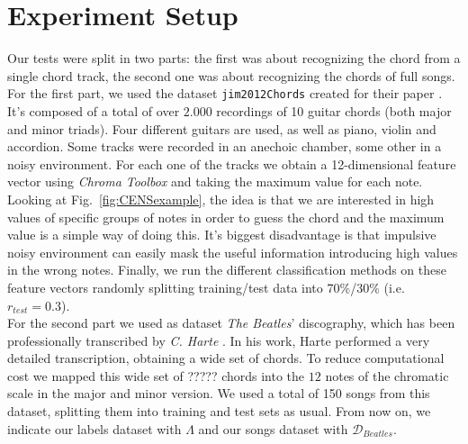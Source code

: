 \section{Experiment Setup}
\label{sec:setup}

Our tests were split in two parts: the first was about recognizing the chord from a single chord track, the second one was about recognizing the chords of full songs.\\
%
For the first part, we used the dataset \texttt{jim2012Chords} \cite{jim2012Chords} created for their paper \cite{JimChordsPaper}. It's composed of a total of over $2.000$ recordings of 10 guitar chords (both major and minor triads). Four different guitars are used, as well as piano, violin and accordion. Some tracks were recorded in an anechoic chamber, some other in a noisy environment. For each one of the tracks we obtain a 12-dimensional feature vector using \textit{Chroma Toolbox} and taking the maximum value for each note. Looking at Fig.~\ref{fig:CENSexample}, the idea is that we are interested in high values of specific groups of notes in order to guess the chord and the maximum value is a simple way of doing this. It's biggest disadvantage is that impulsive noisy environment can easily mask the useful information introducing high values in the wrong notes. Finally, we run the different classification methods on these feature vectors randomly splitting training/test data into 70\%/30\% (i.e. $r_{test}=0.3$).\\
%
For the second part we used as dataset \textit{The Beatles}' discography, which has been professionally transcribed by \textit{C. Harte} \cite{HartePaper}\cite{HarteThesis}. In his work, Harte performed a very detailed transcription, obtaining a wide set of chords. To reduce computational cost we mapped this wide set of ????? chords into the $12$ notes of the chromatic scale in the major and minor version. We used a total of 150 songs from this dataset, splitting them into training and test sets as usual. From now on, we indicate our labels dataset with $\Lambda$ and our songs dataset with $\mathcal{D}_{Beatles}$. \\
%
